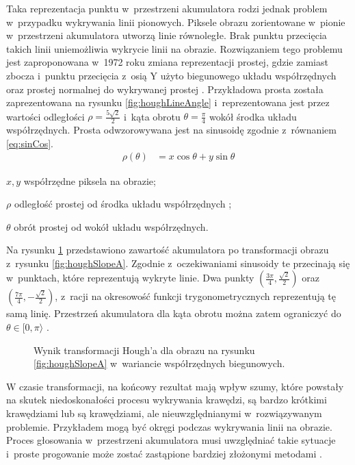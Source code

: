 Taka reprezentacja punktu w~przestrzeni akumulatora rodzi jednak problem w~przypadku wykrywania linii pionowych. Piksele obrazu zorientowane w~pionie w~przestrzeni akumulatora utworzą linie równoległe. Brak punktu przecięcia takich linii uniemożliwia wykrycie linii na obrazie. Rozwiązaniem tego problemu jest zaproponowana w~1972 roku zmiana reprezentacji prostej, gdzie zamiast zbocza i~punktu przecięcia z~osią Y użyto biegunowego układu współrzędnych oraz prostej normalnej do wykrywanej prostej \cite{duda1972use}. Przykładowa prosta została zaprezentowana na rysunku \ref{fig:houghLineAngle} i~reprezentowana jest przez wartości odległości $\rho=\frac{5\sqrt{2}}{2}$ i~kąta obrotu $\theta=\frac{\pi}{4}$ wokół środka układu współrzędnych. Prosta odwzorowywana jest na sinusoidę zgodnie z~równaniem \ref{eq:sinCos}.
\begin{align}
    \rho(\theta) &= x\cos{\theta} + y\sin{\theta} \label{eq:sinCos}
\end{align}
\begin{eqexpl}
    \item{$x, y$} współrzędne piksela na obrazie;
    \item{$\rho$} odległość prostej od środka układu współrzędnych ;
    \item{$\theta$} obrót prostej od wokół układu współrzędnych.
\end{eqexpl}

Na rysunku \ref{fig:houghSinCos} przedstawiono zawartość akumulatora po transformacji obrazu z~rysunku \ref{fig:houghSlopeA}. Zgodnie z~oczekiwaniami sinusoidy te przecinają się w~punktach, które reprezentują wykryte linie. Dwa punkty $(\frac{3\pi}{4}, \frac{\sqrt{2}}{2})$ oraz $(\frac{7\pi}{4}, -\frac{\sqrt{2}}{2})$, z~racji na okresowość funkcji trygonometrycznych reprezentują tę samą linię. Przestrzeń akumulatora dla kąta obrotu można zatem ograniczyć do $\theta \in \lbrack 0, \pi\rangle$ \cite{immerkaer1998some}.

\begin{figure}[t]
    \centering
    
    \caption{Wynik transformacji Hough'a dla obrazu na rysunku \ref{fig:houghSlopeA} w~wariancie współrzędnych biegunowych.}
    \label{fig:houghSinCos}
\end{figure}


W czasie transformacji, na końcowy rezultat mają wpływ szumy, które powstały na skutek niedoskonałości procesu wykrywania krawędzi, są bardzo krótkimi krawędziami lub są krawędziami, ale nieuwzględnianymi w~rozwiązywanym problemie. Przykładem mogą być okręgi podczas wykrywania linii na obrazie. Proces głosowania w~przestrzeni akumulatora musi uwzględniać takie sytuacje i~proste progowanie może zostać zastąpione bardziej złożonymi metodami \cite{palmer1997optimizing, perantonis1998robust}.

